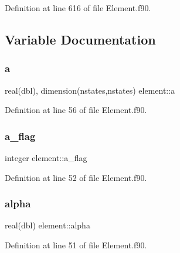 Definition at line 616 of file Element.\+f90.



\subsection{Variable Documentation}
\mbox{\label{namespaceelement_ad0c7d68510d195a504efc593e729263f}} 
\subsubsection{\texorpdfstring{a}{a}}
{\footnotesize\ttfamily real(dbl), dimension(nstates,nstates) element\+::a\hspace{0.3cm}{\ttfamily [private]}}



Definition at line 56 of file Element.\+f90.

\mbox{\label{namespaceelement_a17661475127df7ce4d09fb1e942cbd58}} 
\subsubsection{\texorpdfstring{a\+\_\+flag}{a\_flag}}
{\footnotesize\ttfamily integer element\+::a\+\_\+flag\hspace{0.3cm}{\ttfamily [private]}}



Definition at line 52 of file Element.\+f90.

\mbox{\label{namespaceelement_aa45829429fe33aa2b5cd6feaacc2c739}} 
\subsubsection{\texorpdfstring{alpha}{alpha}}
{\footnotesize\ttfamily real(dbl) element\+::alpha\hspace{0.3cm}{\ttfamily [private]}}



Definition at line 51 of file Element.\+f90.

\mbox{\label{namespaceelement_aab90697519f32a9a4f56786465c1bd0b}} 
